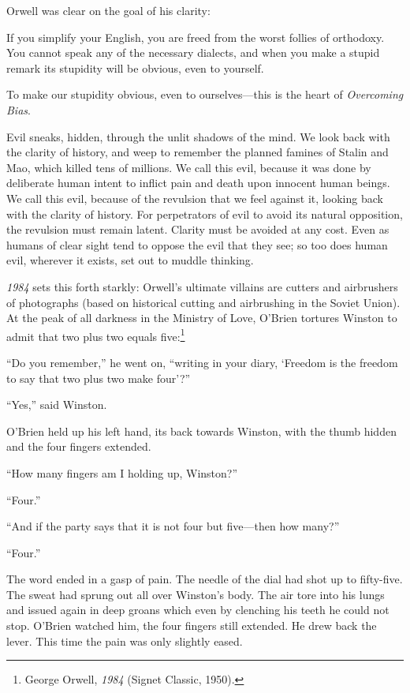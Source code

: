 {
 Orwell was clear on the goal of his clarity:}

{
 If you simplify your English, you are freed from the worst follies
of orthodoxy. You cannot speak any of the necessary dialects, and when
you make a stupid remark its stupidity will be obvious, even to
yourself.}

{
 To make our stupidity obvious, even to ourselves---this is the
heart of \textit{Overcoming Bias}.}

{
 Evil sneaks, hidden, through the unlit shadows of the mind. We
look back with the clarity of history, and weep to remember the planned
famines of Stalin and Mao, which killed tens of millions. We call this
evil, because it was done by deliberate human intent to inflict pain
and death upon innocent human beings. We call this evil, because of the
revulsion that we feel against it, looking back with the clarity of
history. For perpetrators of evil to avoid its natural opposition, the
revulsion must remain latent. Clarity must be avoided at any cost. Even
as humans of clear sight tend to oppose the evil that they see; so too
does human evil, wherever it exists, set out to muddle thinking.}

{
 \textit{1984} sets this forth starkly: Orwell's
ultimate villains are cutters and airbrushers of photographs (based on
historical cutting and airbrushing in the Soviet Union). At the peak of
all darkness in the Ministry of Love, O'Brien tortures
Winston to admit that two plus two equals five:\footnote{George Orwell, \textit{1984} (Signet Classic, 1950).}}

{
 ``Do you remember,'' he went
on, ``writing in your diary, `Freedom
is the freedom to say that two plus two make
four'?''}

{
 ``Yes,'' said Winston.}

{
 O'Brien held up his left hand, its back towards
Winston, with the thumb hidden and the four fingers extended.}

{
 ``How many fingers am I holding up,
Winston?''}

{
 ``Four.''}

{
 ``And if the party says that it is not four but
five---then how many?''}

{
 ``Four.''}

{
 The word ended in a gasp of pain. The needle of the dial had shot
up to fifty-five. The sweat had sprung out all over
Winston's body. The air tore into his lungs and issued
again in deep groans which even by clenching his teeth he could not
stop. O'Brien watched him, the four fingers still
extended. He drew back the lever. This time the pain was only slightly
eased.}

